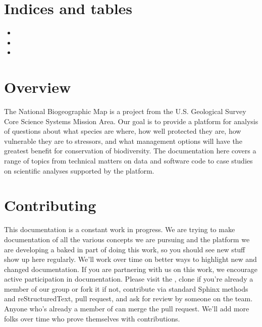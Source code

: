 \documentclass[letterpaper,10pt,english]{sphinxmanual}
\begin{document}
\chapter{Indices and tables}
\label{\detokenize{index:indices-and-tables}}\begin{itemize}
\item {} 

\item {} 

\item {} 

\end{itemize}


\chapter{Overview}
\label{\detokenize{index:overview}}
The National Biogeographic Map is a project from the U.S. Geological Survey Core Science Systems Mission Area. Our goal is to provide a platform for analysis of questions about what species are where, how well protected they are, how vulnerable they are to stressors, and what management options will have the greatest benefit for conservation of biodiversity. The documentation here covers a range of topics from technical matters on data and software code to case studies on scientific analyses supported by the platform.


\chapter{Contributing}
\label{\detokenize{index:contributing}}
This documentation is a constant work in progress. We are trying to make documentation of all the various concepts we are pursuing and the platform we are developing a baked in part of doing this work, so you should see new stuff show up here regularly. We’ll work over time on better ways to highlight new and changed documentation. If you are partnering with us on this work, we encourage active participation in documentation. Please visit the , clone if you’re already a member of our group or fork it if not, contribute via standard Sphinx methods and reStructuredText, pull request, and ask for review by someone on the team. Anyone who’s already a member of  can merge the pull request. We’ll add more folks over time who prove themselves with contributions.
\end{document}

